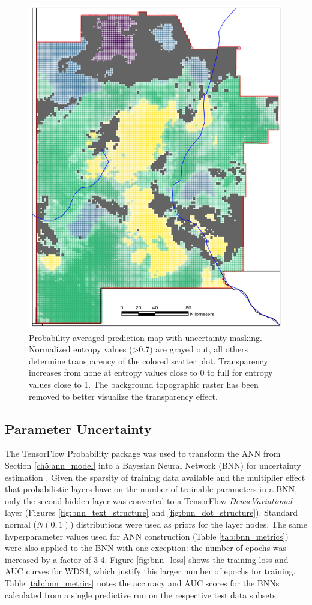 \begin{figure}%
\centering
\includegraphics[width=.75\textwidth]{templates/images/Figure-Masked_Average_Gradient_Map.png}
\caption[Structural uncertainty mask on prediction map]{Probability-averaged prediction map with uncertainty masking. Normalized entropy values (>0.7) are grayed out, all others determine transparency of the colored scatter plot. Transparency increases from none at entropy values close to 0 to full for entropy values close to 1. The background topographic raster has been removed to better visualize the transparency effect.}
\label{fig:avg_gradient_masked_map}
\end{figure}

\subsection{Parameter Uncertainty}\label{ch5:param_uncertainty}
The TensorFlow Probability package was used to transform the ANN from Section \ref{ch5:ann_model} into a Bayesian Neural Network (BNN) for uncertainty estimation \citep{dillon_tensorflow_2017}. Given the sparsity of training data available and the multiplier effect that probabilistic layers have on the number of trainable parameters in a BNN, only the second hidden layer was converted to a TensorFlow \textit{DenseVariational} layer (Figures \ref{fig:bnn_text_structure} and \ref{fig:bnn_dot_structure}). Standard normal ($N(0,1)$) distributions were used as priors for the layer nodes. The same hyperparameter values used for ANN construction (Table \ref{tab:bnn_metrics}) were also applied to the BNN with one exception: the number of epochs was increased by a factor of 3-4. Figure \ref{fig:bnn_loss} shows the training loss and AUC curves for WDS4, which justify this larger number of epochs for training. Table \ref{tab:bnn_metrics} notes the accuracy and AUC scores for the BNNs calculated from a single predictive run on the respective test data subsets.

